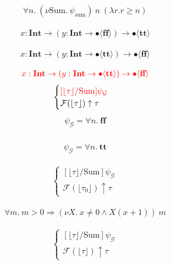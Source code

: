 \documentclass{jarticle}
\theoremstyle{definition}
\newcommand \true {\textbf{tt}}
\newcommand \false {\textbf{ff}}
\newcommand \stypeint {\textbf{Int}}
\newcommand \stypebool {\bullet}
\newcommand \typeint[1]{{#1} : \stypeint}
\newcommand \typebool[1]{\stypebool \langle #1 \rangle}
\newcommand \ti[1]{\typeint{#1}}
\newcommand \tb[1]{\typebool{#1}}
\newcommand {\pdrtop} {\psi_{\mathcal{G}}}
\newcommand {\pdrtransform} {\mathcal{F}}
\newcommand {\pdrF} {\pdrtransform}
\newcommand {\floor}[1] {\lfloor #1 \rfloor }
\newcommand {\pdrtypes} {\uparrow}
\begin{document}
\begin{align*}
    \forall n.\: (\nu \text{Sum}.\: \psi_{\text{sum}})\ n\ (\lambda r. r \geq n)
\end{align*}

\begin{align*}
    \ti{x} \to (\ti{y} \to \tb{\false}) \to \tb{\true}
\end{align*}

\begin{align*}
    \ti{x} \to (\ti{y} \to \tb{\true}) \to \tb{\false}
\end{align*}

\begin{align*}
{\color{red} \ti{x} \to (\ti{y} \to \tb{\true}) \to \tb{\false}}
\end{align*}
\begin{align*}
    \begin{cases}
{\color{red} [\floor{\tau}/\text{Sum}]\pdrtop} \\
        \pdrF(\floor{\tau}) \pdrtypes \tau
    \end{cases}
\end{align*}
\begin{align*}
        [\floor{\tau_1}/\text{Sum}]\pdrtop = \forall n.\: \false\\
\end{align*}

\begin{align*}
    [\pdrF(\floor{\tau_0})/\text{Sum}]\pdrtop = \forall n.\: \true
\end{align*}

\begin{align*}
    \begin{cases}
        [\floor{\tau}/\text{Sum}]\pdrtop \\
        \pdrF(\floor{\tau_0}) \pdrtypes \tau
    \end{cases}
\end{align*}

\begin{align*}
    \forall m.\: m > 0 \Rightarrow (\nu X.\: x\neq 0 \wedge X(x + 1))\ m
\end{align*}

\begin{align*}
    \begin{cases}
        [\floor{\tau}/\text{Sum}]\pdrtop \\
        \pdrF(\floor{\tau}) \pdrtypes \tau
    \end{cases}
\end{align*}
\end{document}
